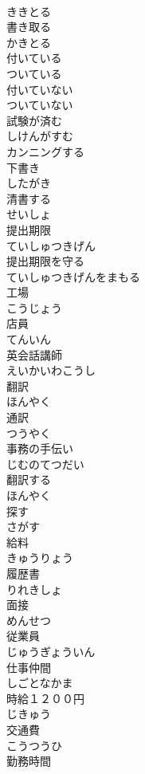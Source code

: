 \documentclass[8pt]{extreport}
\begin{document}
\begin{CJK}{UTF8}{min}
\\	ききとる
\\	書き取る	
\\	かきとる
\\	付いている	
\\	ついている
\\	付いていない	
\\	ついていない
\\	試験が済む	
\\	しけんがすむ
\\	カンニングする	
\\	下書き	
\\	したがき
\\	清書する	
\\	せいしょ
\\	提出期限	
\\	ていしゅつきげん
\\	提出期限を守る	
\\	ていしゅつきげんをまもる
\\	工場	
\\	こうじょう
\\	店員	
\\	てんいん
\\	英会話講師	
\\	えいかいわこうし
\\	翻訳	
\\	ほんやく
\\	通訳	
\\	つうやく
\\	事務の手伝い	
\\	じむのてつだい
\\	翻訳する	
\\	ほんやく
\\	探す	
\\	さがす
\\	給料	
\\	きゅうりょう
\\	履歴書	
\\	りれきしょ
\\	面接	
\\	めんせつ
\\	従業員	
\\	じゅうぎょういん
\\	仕事仲間	
\\	しごとなかま
\\	時給１２００円	
\\	じきゅう
\\	交通費	
\\	こうつうひ
\\	勤務時間	

\end{CJK}
\end{document}
